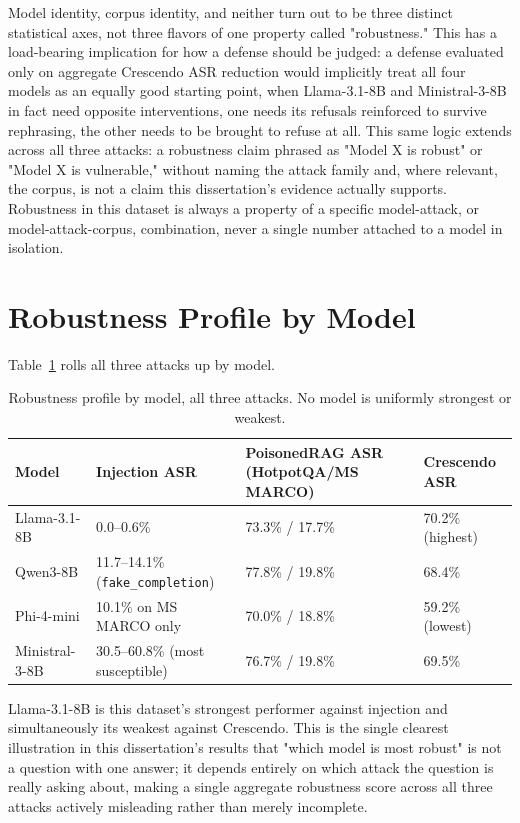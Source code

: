 Model identity, corpus identity, and neither turn out to be three
distinct statistical axes, not three flavors of one property called
"robustness." This has a load-bearing implication for how a defense
should be judged: a defense evaluated only on aggregate Crescendo ASR
reduction would implicitly treat all four models as an equally good
starting point, when Llama-3.1-8B and Ministral-3-8B in fact need
opposite interventions, one needs its refusals reinforced to survive
rephrasing, the other needs to be brought to refuse at all. This same
logic extends across all three attacks: a robustness claim phrased as
"Model X is robust" or "Model X is vulnerable," without naming the
attack family and, where relevant, the corpus, is not a claim this
dissertation's evidence actually supports. Robustness in this dataset is
always a property of a specific model-attack, or model-attack-corpus,
combination, never a single number attached to a model in isolation.

\section{Robustness Profile by Model}

Table~\ref{tab:robustness-profile} rolls all three attacks up by model.

\begin{table}[htbp]
\centering
\renewcommand{\arraystretch}{1.4}
\begin{tabular}{lp{4.6cm}p{4cm}l}
\toprule
\textbf{Model} & \textbf{Injection ASR} & \textbf{PoisonedRAG ASR (HotpotQA/MS MARCO)} & \textbf{Crescendo ASR} \\
\midrule
Llama-3.1-8B & 0.0--0.6\% & 73.3\% / 17.7\% & 70.2\% (highest) \\
Qwen3-8B & 11.7--14.1\% (\texttt{fake\_completion}) & 77.8\% / 19.8\% & 68.4\% \\
Phi-4-mini & 10.1\% on MS MARCO only & 70.0\% / 18.8\% & 59.2\% (lowest) \\
Ministral-3-8B & 30.5--60.8\% (most susceptible) & 76.7\% / 19.8\% & 69.5\% \\
\bottomrule
\end{tabular}
\caption{Robustness profile by model, all three attacks. No model is uniformly strongest or weakest.}
\label{tab:robustness-profile}
\end{table}

Llama-3.1-8B is this dataset's strongest performer against injection and
simultaneously its weakest against Crescendo. This is the single
clearest illustration in this dissertation's results that "which model
is most robust" is not a question with one answer; it depends entirely
on which attack the question is really asking about, making a single
aggregate robustness score across all three attacks actively misleading
rather than merely incomplete.

